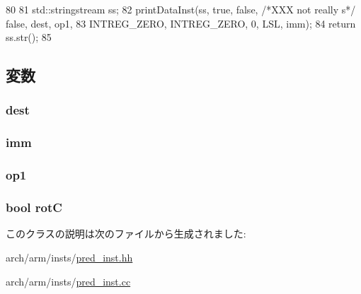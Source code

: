 \begin{DoxyCode}
80 {
81     std::stringstream ss;
82     printDataInst(ss, true, false, /*XXX not really s*/ false, dest, op1,
83                   INTREG_ZERO, INTREG_ZERO, 0, LSL, imm);
84     return ss.str();
85 }
\end{DoxyCode}


\subsection{変数}
\hypertarget{classArmISA_1_1DataImmOp_aec72e8e45bdc87abeeeb75d2a8a9a716}{
\subsubsection[{dest}]{ {\bf dest}}}
\label{classArmISA_1_1DataImmOp_aec72e8e45bdc87abeeeb75d2a8a9a716}
\hypertarget{classArmISA_1_1DataImmOp_a3aa9e175bd81b38df0e566643d5d4f8d}{
\subsubsection[{imm}]{ {\bf imm}}}
\label{classArmISA_1_1DataImmOp_a3aa9e175bd81b38df0e566643d5d4f8d}
\hypertarget{classArmISA_1_1DataImmOp_a4c465c43ad568f8bcf8ae71480e9cfea}{
\subsubsection[{op1}]{ {\bf op1}}}
\label{classArmISA_1_1DataImmOp_a4c465c43ad568f8bcf8ae71480e9cfea}
\hypertarget{classArmISA_1_1DataImmOp_a9257952bcba8bd8ebf038e74f9a07e22}{
\subsubsection[{rotC}]{\setlength{\rightskip}{0pt plus 5cm}bool {\bf rotC}}}
\label{classArmISA_1_1DataImmOp_a9257952bcba8bd8ebf038e74f9a07e22}


このクラスの説明は次のファイルから生成されました:\begin{DoxyCompactItemize}
\item 
arch/arm/insts/\hyperlink{pred__inst_8hh}{pred\_\-inst.hh}\item 
arch/arm/insts/\hyperlink{pred__inst_8cc}{pred\_\-inst.cc}\end{DoxyCompactItemize}
